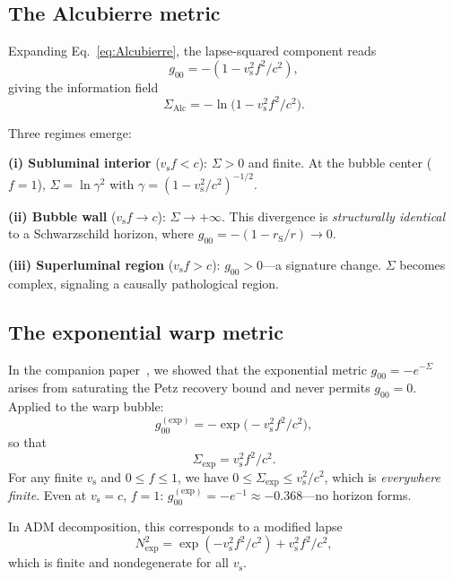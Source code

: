 \documentclass[prd,twocolumn,superscriptaddress,longbibliography]{revtex4-2}
\newcommand{\vs}{v_{\mathrm{s}}}
\begin{document}
\subsection{The Alcubierre metric}

Expanding Eq.~\eqref{eq:Alcubierre}, the lapse-squared component
reads
\begin{equation}
\label{eq:g00_Alc}
g_{00} = -(1 - \vs^2 f^2/c^2),
\end{equation}
giving the information field
\begin{equation}
\label{eq:Sigma_Alc}
\Sigma_{\mathrm{Alc}} = -\ln\!\bigl(1 - \vs^2 f^2/c^2\bigr).
\end{equation}

Three regimes emerge:

\medskip
\noindent\textbf{(i) Subluminal interior} ($\vs f < c$):
$\Sigma > 0$ and finite.  At the bubble center ($f = 1$),
$\Sigma = \ln\gamma^2$ with $\gamma = (1 - \vs^2/c^2)^{-1/2}$.

\medskip
\noindent\textbf{(ii) Bubble wall} ($\vs f \to c$):
$\Sigma \to +\infty$.  This divergence is \emph{structurally
identical} to a Schwarzschild horizon, where
$g_{00} = -(1 - r_{\mathrm{S}}/r) \to 0$.

\medskip
\noindent\textbf{(iii) Superluminal region} ($\vs f > c$):
$g_{00} > 0$---a signature change.  $\Sigma$ becomes complex,
signaling a causally pathological region.

\subsection{The exponential warp metric}

In the companion paper~\cite{Huang2026b}, we showed that the
exponential metric $g_{00} = -e^{-\Sigma}$ arises from saturating
the Petz recovery bound and never permits $g_{00} = 0$.  Applied
to the warp bubble:
\begin{equation}
\label{eq:exp_warp}
g_{00}^{(\mathrm{exp})} = -\exp\!\bigl(-\vs^2 f^2/c^2\bigr),
\end{equation}
so that
\begin{equation}
\label{eq:Sigma_exp}
\Sigma_{\mathrm{exp}} = \vs^2 f^2/c^2.
\end{equation}
For any finite $\vs$ and $0 \leq f \leq 1$, we have
$0 \leq \Sigma_{\mathrm{exp}} \leq \vs^2/c^2$, which is
\emph{everywhere finite}.  Even at $\vs = c$, $f = 1$:
$g_{00}^{(\mathrm{exp})} = -e^{-1} \approx -0.368$---no horizon
forms.

In ADM decomposition, this corresponds to a modified lapse
\begin{equation}
N_{\mathrm{exp}}^2 = \exp(-\vs^2 f^2/c^2) + \vs^2 f^2/c^2,
\end{equation}
which is finite and nondegenerate for all $\vs$.
\end{document}
